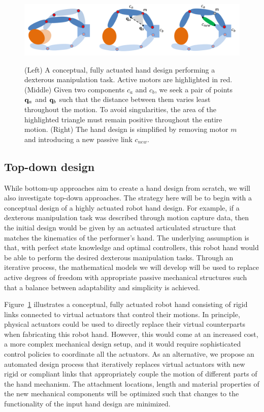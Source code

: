 \begin{figure}
\begin{center}
{\includegraphics[width=6in]{./figs/handDesign.png}}
\end{center}
\vspace*{-0.2in}
\caption[]{(Left) A conceptual, fully actuated hand design performing a dexterous manipulation task. Active motors are highlighted in red. (Middle) Given two components $c_a$ and $c_b$, we seek a pair of points $\mathbf{q}_a$ and $\mathbf{q}_b$ such that the distance between them varies least throughout the motion. To avoid singularities, the area of the highlighted triangle must remain positive throughout the entire motion. (Right) The hand design is simplified by removing motor $m$ and introducing a new passive link $c_{new}$.}
\label{handMechanismDesign}
\end{figure}

\subsection{Top-down design}

While bottom-up approaches aim to create a hand design from scratch, we will also investigate top-down approaches. The strategy here will be to begin with a conceptual design of a highly actuated robot hand design. For example, if a dexterous manipulation task was described through motion capture data, then the initial design would be given by an actuated articulated structure that matches the kinematics of the performer's hand. The underlying assumption is that, with perfect state knowledge and optimal controllers, this robot hand would be able to perform the desired dexterous manipulation tasks. Through an iterative process, the mathematical models we will develop will be used to replace active degrees of freedom with appropriate passive mechanical structures such that a balance between adaptability and simplicity is achieved. 

Figure~\ref{handMechanismDesign} illustrates a conceptual, fully actuated robot hand consisting of rigid links connected to virtual actuators that control their motions. In principle, physical actuators could be used to directly replace their virtual counterparts when fabricating this robot hand. However, this would come at an increased cost, a more complex mechanical design setup, and it would require sophisticated control policies to coordinate all the actuators. As an alternative, we propose an automated design process that iteratively replaces virtual actuators with new rigid or compliant links that appropriately couple the motion of different parts of the hand mechanism. The attachment locations, length and material properties of the new mechanical components will be optimized such that changes to the functionality of the input hand design are minimized. 

